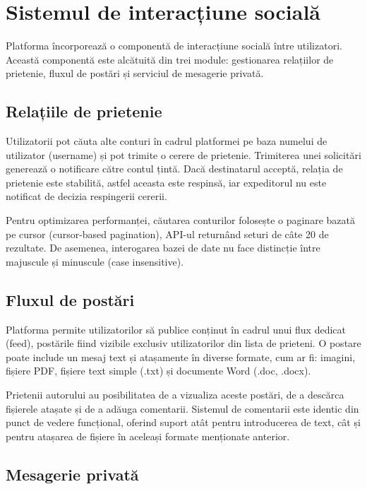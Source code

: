 \section{Sistemul de interacțiune socială}

Platforma încorporează o componentă de interacțiune socială între utilizatori. Această componentă este alcătuită din trei module: gestionarea relațiilor de prietenie, fluxul de postări și serviciul de mesagerie privată. 

\subsection{Relațiile de prietenie}

Utilizatorii pot căuta alte conturi în cadrul platformei pe baza numelui de utilizator (username) și pot trimite o cerere de prietenie. Trimiterea unei solicitări generează o notificare către contul țintă. Dacă destinatarul acceptă, relația de prietenie este stabilită, astfel aceasta este respinsă, iar expeditorul nu este notificat de decizia respingerii cererii. 

Pentru optimizarea performanței, căutarea conturilor folosește o paginare bazată pe cursor (cursor-based pagination), API-ul returnând seturi de câte 20 de rezultate. De asemenea, interogarea bazei de date nu face distincție între majuscule și minuscule (case insensitive).

\subsection{Fluxul de postări}

Platforma permite utilizatorilor să publice conținut în cadrul unui flux dedicat (feed), postările fiind vizibile exclusiv utilizatorilor din lista de prieteni. O postare poate include un mesaj text și atașamente în diverse formate, cum ar fi: imagini, fișiere PDF, fișiere text simple (.txt) și documente Word (.doc, .docx). 

Prietenii autorului au posibilitatea de a vizualiza aceste postări, de a descărca fișierele atașate și de a adăuga comentarii. Sistemul de comentarii este identic din punct de vedere funcțional, oferind suport atât pentru introducerea de text, cât și pentru atașarea de fișiere în aceleași formate menționate anterior.

\subsection{Mesagerie privată}

